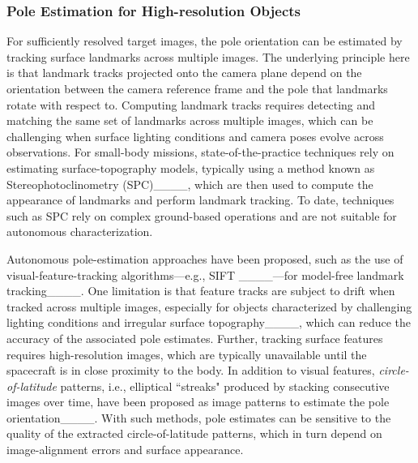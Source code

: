 \subsubsection{Pole Estimation for High-resolution Objects}

For sufficiently resolved target images, the pole orientation can be estimated by tracking surface landmarks across multiple images. The underlying principle here is that landmark tracks projected onto the camera plane depend on the orientation between the camera reference frame and the pole that landmarks rotate with respect to. Computing landmark tracks requires detecting and matching the same set of landmarks across multiple images, which can be challenging when surface lighting conditions and camera poses evolve across observations. For small-body missions, state-of-the-practice techniques rely on estimating surface-topography models, typically using a method known as Stereophotoclinometry (SPC)____, which are then used to compute the appearance of landmarks and perform landmark tracking. To date, techniques such as SPC rely on complex ground-based operations and are not suitable for autonomous characterization.

Autonomous pole-estimation approaches have been proposed, such as the use of visual-feature-tracking algorithms---e.g., SIFT ____---for model-free landmark tracking____. One limitation is that feature tracks are subject to drift when tracked across multiple images, especially for objects characterized by challenging lighting conditions and irregular surface topography____, which can reduce the accuracy of the associated pole estimates. Further, tracking surface features requires high-resolution images, which are typically unavailable until the spacecraft is in close proximity to the body. In addition to visual features, \textit{circle-of-latitude} patterns, i.e., elliptical ``streaks" produced by stacking consecutive images over time, have been proposed as image patterns to estimate the pole orientation____. With such methods, pole estimates can be sensitive to the quality of the extracted circle-of-latitude patterns, which in turn depend on image-alignment errors and surface appearance.